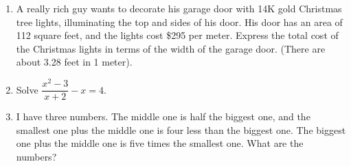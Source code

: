 \documentclass[12pt,letterpaper]{article}
\begin{document}
\begin{enumerate}
\pagebreak
\item A really rich guy wants to decorate his garage door with 14K gold Christmas tree lights, illuminating the top and sides of his door. His door has an area of 112 square feet, and the lights cost \$295 per meter. Express the total cost of the Christmas lights in terms of the width of the garage door. (There are about 3.28 feet in 1 meter). 
\vfill

\item Solve $\dfrac{x^2-3}{x+2}-x=4$. 
\vfill 

\item I have three numbers. The middle one is half the biggest one,
and the smallest one plus the middle one is four less than
the biggest one. The biggest one plus the middle one is five times the smallest one.  What are the numbers?
\vfill




\end{enumerate}
\end{document}
